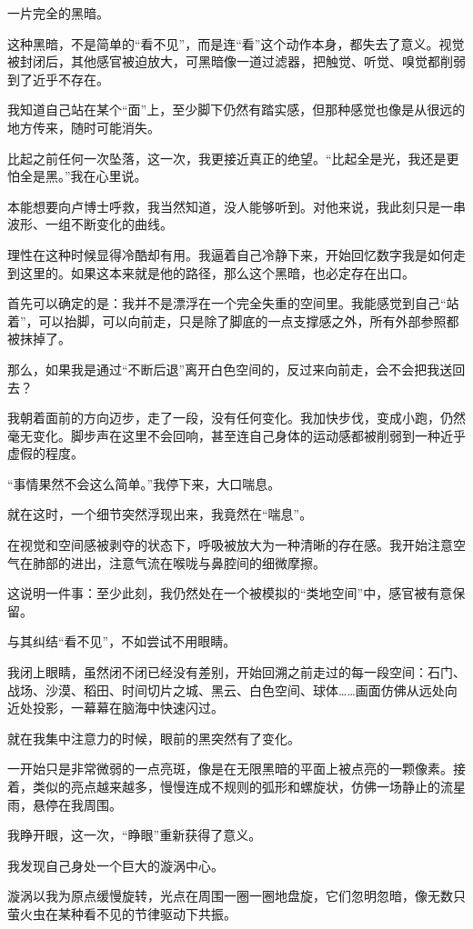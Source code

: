 一片完全的黑暗。

这种黑暗，不是简单的“看不见”，而是连“看”这个动作本身，都失去了意义。视觉被封闭后，其他感官被迫放大，可黑暗像一道过滤器，把触觉、听觉、嗅觉都削弱到了近乎不存在。

我知道自己站在某个“面”上，至少脚下仍然有踏实感，但那种感觉也像是从很远的地方传来，随时可能消失。

比起之前任何一次坠落，这一次，我更接近真正的绝望。“比起全是光，我还是更怕全是黑。”我在心里说。

本能想要向卢博士呼救，我当然知道，没人能够听到。对他来说，我此刻只是一串波形、一组不断变化的曲线。

理性在这种时候显得冷酷却有用。我逼着自己冷静下来，开始回忆数字我是如何走到这里的。如果这本来就是他的路径，那么这个黑暗，也必定存在出口。

首先可以确定的是：我并不是漂浮在一个完全失重的空间里。我能感觉到自己“站着”，可以抬脚，可以向前走，只是除了脚底的一点支撑感之外，所有外部参照都被抹掉了。

那么，如果我是通过“不断后退”离开白色空间的，反过来向前走，会不会把我送回去？

我朝着面前的方向迈步，走了一段，没有任何变化。我加快步伐，变成小跑，仍然毫无变化。脚步声在这里不会回响，甚至连自己身体的运动感都被削弱到一种近乎虚假的程度。

“事情果然不会这么简单。”我停下来，大口喘息。

就在这时，一个细节突然浮现出来，我竟然在“喘息”。

在视觉和空间感被剥夺的状态下，呼吸被放大为一种清晰的存在感。我开始注意空气在肺部的进出，注意气流在喉咙与鼻腔间的细微摩擦。

这说明一件事：至少此刻，我仍然处在一个被模拟的“类地空间”中，感官被有意保留。

与其纠结“看不见”，不如尝试不用眼睛。

我闭上眼睛，虽然闭不闭已经没有差别，开始回溯之前走过的每一段空间：石门、战场、沙漠、稻田、时间切片之城、黑云、白色空间、球体……画面仿佛从远处向近处投影，一幕幕在脑海中快速闪过。

就在我集中注意力的时候，眼前的黑突然有了变化。

一开始只是非常微弱的一点亮斑，像是在无限黑暗的平面上被点亮的一颗像素。接着，类似的亮点越来越多，慢慢连成不规则的弧形和螺旋状，仿佛一场静止的流星雨，悬停在我周围。

我睁开眼，这一次，“睁眼”重新获得了意义。

我发现自己身处一个巨大的漩涡中心。

漩涡以我为原点缓慢旋转，光点在周围一圈一圈地盘旋，它们忽明忽暗，像无数只萤火虫在某种看不见的节律驱动下共振。

